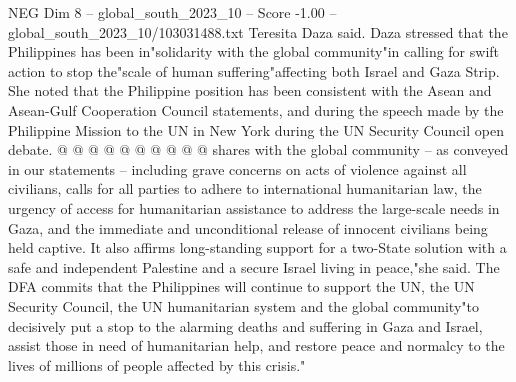 \begin{textsample}{NEG Dim 8 – global\_south\_2023\_10 – Score -1.00 – global\_south\_2023\_10/103031488.txt}
Teresita Daza said.
Daza stressed that the Philippines has been in"solidarity with the global community"in calling for swift action to stop the"scale of human suffering"affecting both Israel and Gaza Strip.
She noted that the Philippine position has been consistent with the Asean and Asean-Gulf Cooperation Council statements, and during the speech made by the Philippine Mission to the UN in New York during the UN Security Council open debate. @ @ @ @ @ @ @ @ @ @ shares with the global community -- as conveyed in our statements -- including grave concerns on acts of violence against all civilians, calls for all parties to adhere to international humanitarian law, the urgency of access for humanitarian assistance to address the large-scale needs in Gaza, and the immediate and unconditional release of innocent civilians being held captive.
It also affirms long-standing support for a two-State solution with a safe and independent Palestine and a secure Israel living in peace,"she said.
The DFA commits that the Philippines will continue to support the UN, the UN Security Council, the UN humanitarian system and the global community"to decisively put a stop to the alarming deaths and suffering in Gaza and Israel, assist those in need of humanitarian help, and restore peace and normalcy to the lives of millions of people affected by this crisis."

\end{textsample}
